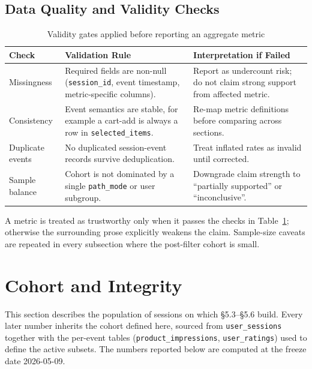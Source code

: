 \subsection{Data Quality and Validity Checks}
\label{subsec:data_quality_validity}

\begin{table}[H]
\centering
\begin{tabular}{p{4.0cm}p{4.7cm}p{5.0cm}}
\toprule
\textbf{Check} & \textbf{Validation Rule} & \textbf{Interpretation if Failed}\\
\midrule
Missingness & Required fields are non-null (\texttt{session\_id}, event timestamp, metric-specific columns). & Report as undercount risk; do not claim strong support from affected metric.\\
Consistency & Event semantics are stable, for example a cart-add is always a row in \texttt{selected\_items}. & Re-map metric definitions before comparing across sections.\\
Duplicate events & No duplicated session-event records survive deduplication. & Treat inflated rates as invalid until corrected.\\
Sample balance & Cohort is not dominated by a single \texttt{path\_mode} or user subgroup. & Downgrade claim strength to ``partially supported'' or ``inconclusive''.\\
\bottomrule
\end{tabular}
\caption{Validity gates applied before reporting an aggregate metric}
\label{tab:data_validity_checks}
\end{table}

A metric is treated as trustworthy only when it passes the checks in Table~\ref{tab:data_validity_checks}; otherwise the surrounding prose explicitly weakens the claim. Sample-size caveats are repeated in every subsection where the post-filter cohort is small.


\section{Cohort and Integrity}
\label{sec:cohort_integrity}

This section describes the population of sessions on which §5.3--§5.6 build. Every later number inherits the cohort defined here, sourced from \texttt{user\_sessions} together with the per-event tables (\texttt{product\_impressions}, \texttt{user\_ratings}) used to define the active subsets. The numbers reported below are computed at the freeze date 2026-05-09.

